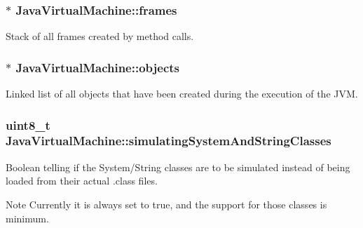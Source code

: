 \subsubsection[{\texorpdfstring{frames}{frames}}]{$\ast$ Java\+Virtual\+Machine\+::frames}\hypertarget{structJavaVirtualMachine_a6a0d723bb649fabc57742221b01b3617}{}\label{structJavaVirtualMachine_a6a0d723bb649fabc57742221b01b3617}


Stack of all frames created by method calls. 

\subsubsection[{\texorpdfstring{objects}{objects}}]{$\ast$ Java\+Virtual\+Machine\+::objects}\hypertarget{structJavaVirtualMachine_a7513525a761cf3172a0ed080cafcee06}{}\label{structJavaVirtualMachine_a7513525a761cf3172a0ed080cafcee06}


Linked list of all objects that have been created during the execution of the J\+VM. 

\subsubsection[{\texorpdfstring{simulating\+System\+And\+String\+Classes}{simulatingSystemAndStringClasses}}]{\setlength{\rightskip}{0pt plus 5cm}uint8\+\_\+t Java\+Virtual\+Machine\+::simulating\+System\+And\+String\+Classes}\hypertarget{structJavaVirtualMachine_a98897bec4e614dd62c3d5b1543efd57d}{}\label{structJavaVirtualMachine_a98897bec4e614dd62c3d5b1543efd57d}


Boolean telling if the System/\+String classes are to be simulated instead of being loaded from their actual .class files. 

\begin{DoxyNote}{Note}
Currently it is always set to true, and the support for those classes is minimum. 
\end{DoxyNote}

